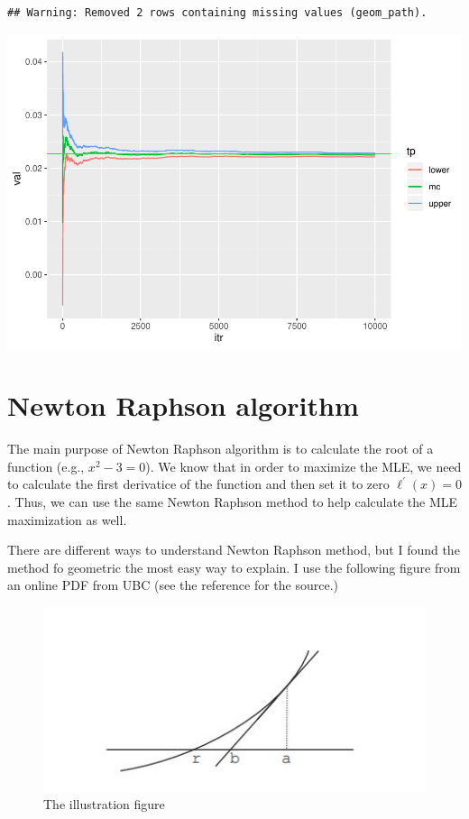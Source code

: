 \documentclass[]{book}
\begin{document}
\begin{verbatim}
## Warning: Removed 2 rows containing missing values (geom_path).
\end{verbatim}

\includegraphics{bookdown-demo_files/figure-latex/unnamed-chunk-18-1.pdf}

\section{Newton Raphson algorithm}\label{newton-raphson-algorithm}

The main purpose of Newton Raphson algorithm is to calculate the root of
a function (e.g., \(x^2-3=0\)). We know that in order to maximize the
MLE, we need to calculate the first derivatice of the function and then
set it to zero \(\ell^{'}(x)=0\). Thus, we can use the same Newton
Raphson method to help calculate the MLE maximization as well.

There are different ways to understand Newton Raphson method, but I
found the method fo geometric the most easy way to explain. I use the
following figure from an online PDF from UBC (see the reference for the
source.)

\begin{figure}
\centering
\includegraphics{Newton.jpg}
\caption{The illustration figure}
\end{figure}
\end{document}
